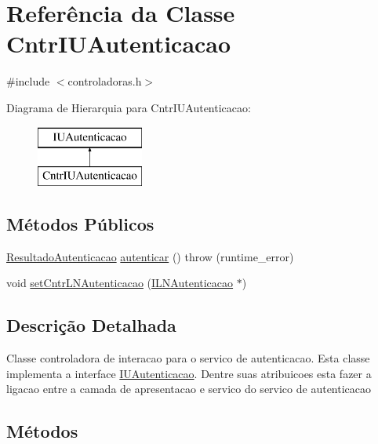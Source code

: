 \hypertarget{class_cntr_i_u_autenticacao}{}\section{Referência da Classe Cntr\+I\+U\+Autenticacao}
\label{class_cntr_i_u_autenticacao}


{\ttfamily \#include $<$controladoras.\+h$>$}

Diagrama de Hierarquia para Cntr\+I\+U\+Autenticacao\+:\begin{figure}[H]
\begin{center}
\leavevmode
\includegraphics[height=2.000000cm]{class_cntr_i_u_autenticacao}
\end{center}
\end{figure}
\subsection*{Métodos Públicos}
\begin{DoxyCompactItemize}
\item 
\hyperlink{class_resultado_autenticacao}{Resultado\+Autenticacao} \hyperlink{class_cntr_i_u_autenticacao_a753ca57d7de28b1535696df732b6fba6}{autenticar} ()  throw (runtime\+\_\+error)
\item 
void \hyperlink{class_cntr_i_u_autenticacao_a4ee05cc87ef8cf13e9ba6a3390ac1943}{set\+Cntr\+L\+N\+Autenticacao} (\hyperlink{class_i_l_n_autenticacao}{I\+L\+N\+Autenticacao} $\ast$)
\end{DoxyCompactItemize}


\subsection{Descrição Detalhada}
Classe controladora de interacao para o servico de autenticacao. Esta classe implementa a interface \hyperlink{class_i_u_autenticacao}{I\+U\+Autenticacao}. Dentre suas atribuicoes esta fazer a ligacao entre a camada de apresentacao e servico do servico de autenticacao 

\subsection{Métodos}
\mbox{\label{class_cntr_i_u_autenticacao_a753ca57d7de28b1535696df732b6fba6}} 
